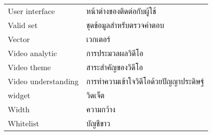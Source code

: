 \begin{abbreviations}
    \noindent
    \begin{tabular*}{\textwidth}{@{}p{}p{}@{}}
	User interface & หน้าต่างของติดต่อกับผู้ใช้\\
	Valid set & ชุดข้อมูลสำหรับตรวจคำตอบ\\
	Vector & เวกเตอร์\\
	Video analytic & การประมวลผลวิดีโอ\\
	Video theme & สาระสำคัญของวิดีโอ\\
	Video understanding & การทำความเข้าใจวิดีโอด้วยปัญญาประดิษฐ์\\
	widget & วิดเจ็ต \\
	Width & ความกว้าง\\
	Whitelist & บัญชีขาว\\
    \end{tabular*}
\end{abbreviations}